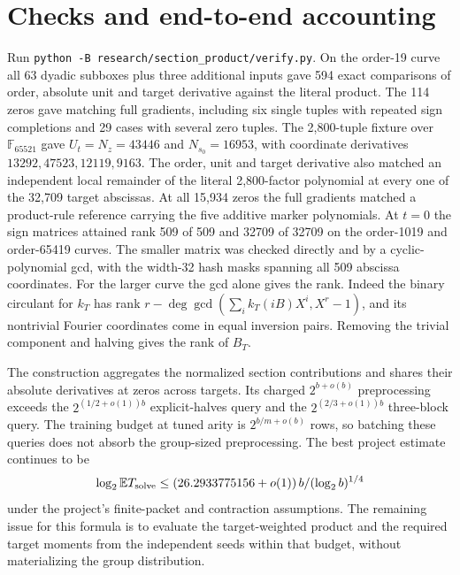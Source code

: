\documentclass[11pt]{article}
\newcommand{\F}{\mathbb F}
\begin{document}
\section{Checks and end-to-end accounting}
Run \texttt{python -B research/section\_product/verify.py}.
On the order-19 curve all 63 dyadic subboxes plus three additional
inputs gave 594 exact comparisons of order, absolute unit and target
derivative against the literal product. The 114 zeros gave matching
full gradients, including six single tuples with repeated sign
completions and 29 cases with several zero tuples. The 2,800-tuple
fixture over $\F_{65521}$ gave $U_t=N_z=43446$ and
$N_{s_0}=16953$, with coordinate derivatives
$13292,47523,12119,9163$. The order, unit and target derivative
also matched an independent local remainder of the literal
2,800-factor polynomial at every one of the 32,709 target abscissas.
At all 15,934 zeros the full gradients matched a product-rule
reference carrying the five additive marker polynomials.
At $t=0$ the sign matrices attained rank 509 of 509 and 32709 of
32709 on the order-1019 and order-65419 curves. The smaller matrix
was checked directly and by a cyclic-polynomial gcd, with the
width-32 hash masks spanning all 509 abscissa coordinates. For
the larger curve the gcd alone gives the rank. Indeed the binary
circulant for $k_T$ has rank
$r-\deg\gcd(\sum_i k_T(iB)X^i,X^r-1)$, and its nontrivial Fourier
coordinates come in equal inversion pairs. Removing the trivial
component and halving gives the rank of $B_T$.

The construction aggregates the normalized section contributions
and shares their absolute derivatives at zeros across targets.
Its charged $2^{b+o(b)}$ preprocessing exceeds the
$2^{(1/2+o(1))b}$ explicit-halves query and the
$2^{(2/3+o(1))b}$ three-block query. The training budget at tuned
arity is $2^{b/m+o(b)}$ rows, so batching these queries does not
absorb the group-sized preprocessing. The best project estimate
continues to be
\[
 \log_2\mathbb E T_{\rm solve}\le
 (26.2933775156+o(1))\,b/(\log_2 b)^{1/4}
\]
under the project's finite-packet and contraction assumptions.
The remaining issue for this formula is to evaluate the
target-weighted product and the required target moments from the
independent seeds within that budget, without materializing the
group distribution.
\end{document}
